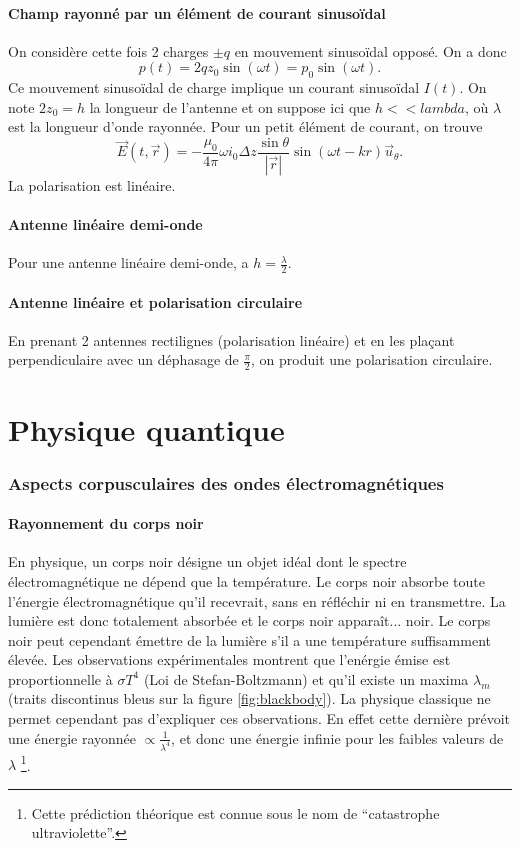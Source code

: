 \subsection{Champ rayonné par un élément de courant sinusoïdal}
On considère cette fois 2 charges $\pm q$ en mouvement
sinusoïdal opposé. On a donc
\[ p(t) = 2qz_0\sin(\omega t) = p_0\sin(\omega t).\]
Ce mouvement sinusoïdal de charge implique un courant
sinusoïdal $I(t)$. On note $2z_0 = h$ la longueur
de l'antenne et on suppose ici que $h << lambda$,
où $\lambda$ est la longueur d'onde rayonnée.
Pour un petit élément de courant, on trouve
\[ \vec{E}(t,\vec{r}) = -\frac{\mu_0}{4\pi}\omega
i_0\Delta z \frac{\sin\theta}{|\vec{r}|}\sin(\omega
t-kr)\vec{u}_\theta. \]
La polarisation est linéaire.

\subsection{Antenne linéaire demi-onde}
Pour une antenne linéaire demi-onde, a $h = \frac{\lambda}{2}$.

\subsection{Antenne linéaire et polarisation circulaire}
En prenant 2 antennes rectilignes (polarisation linéaire)
et en les plaçant perpendiculaire avec un déphasage de
$\frac{\pi}{2}$, on produit une polarisation circulaire.



\part{Physique quantique}
\section{Aspects corpusculaires des ondes électromagnétiques}
\subsection{Rayonnement du corps noir}
En physique, un corps noir désigne un objet idéal dont
le spectre électromagnétique ne dépend que la température.
Le corps noir absorbe toute l'énergie électromagnétique
qu'il recevrait, sans en réfléchir ni en transmettre.
La lumière est donc totalement absorbée et le corps noir
apparaît... noir. Le corps noir peut cependant
émettre de la lumière s'il a une température
suffisamment élevée. Les observations expérimentales
montrent que l'enérgie émise est proportionnelle à $\sigma T^4$
(Loi de Stefan-Boltzmann) et qu'il existe un maxima $\lambda_m$
(traits discontinus bleus sur la figure \ref{fig:blackbody}).
La physique classique ne permet cependant pas d'expliquer
ces observations. En effet cette dernière prévoit une
énergie rayonnée $\propto \frac{1}{\lambda^4}$, et donc
une énergie infinie pour les faibles valeurs de $\lambda$
\footnote{Cette prédiction théorique est connue sous le nom
de ``catastrophe ultraviolette''.}.

